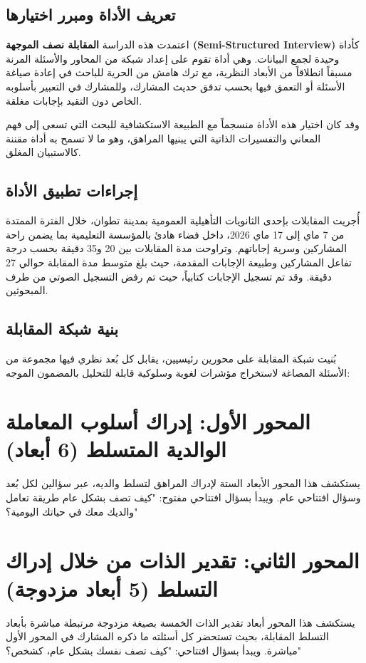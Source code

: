 \documentclass[12pt,oneside]{report}
\begin{document}
\subsection{تعريف الأداة ومبرر اختيارها}
اعتمدت هذه الدراسة \textbf{المقابلة نصف الموجهة (Semi-Structured Interview)} كأداة وحيدة لجمع البيانات. وهي أداة تقوم على إعداد شبكة من المحاور والأسئلة المرنة مسبقاً انطلاقاً من الأبعاد النظرية، مع ترك هامش من الحرية للباحث في إعادة صياغة الأسئلة أو التعمق فيها بحسب تدفق حديث المشارك، وللمشارك في التعبير بأسلوبه الخاص دون التقيد بإجابات مغلقة.

وقد كان اختيار هذه الأداة منسجماً مع الطبيعة الاستكشافية للبحث التي تسعى إلى فهم المعاني والتفسيرات الذاتية التي يبنيها المراهق، وهو ما لا تسمح به أداة مقننة كالاستبيان المغلق.

\subsection{إجراءات تطبيق الأداة}
أُجريت المقابلات بإحدى الثانويات التأهيلية العمومية بمدينة تطوان، خلال الفترة الممتدة من 7 ماي إلى 17 ماي 2026، داخل فضاء هادئ بالمؤسسة التعليمية بما يضمن راحة المشاركين وسرية إجاباتهم. وتراوحت مدة المقابلات بين 20 و35 دقيقة بحسب درجة تفاعل المشاركين وطبيعة الإجابات المقدمة، حيث بلغ متوسط مدة المقابلة حوالي 27 دقيقة. وقد تم تسجيل الإجابات كتابياً، حيث تم رفض التسجيل الصوتي من طرف المبحوثين.

\subsection{بنية شبكة المقابلة}
بُنيت شبكة المقابلة على محورين رئيسيين، يقابل كل بُعد نظري فيها مجموعة من الأسئلة المصاغة لاستخراج مؤشرات لغوية وسلوكية قابلة للتحليل بالمضمون الموجه:

\section{المحور الأول: إدراك أسلوب المعاملة الوالدية المتسلط (6 أبعاد)}
يستكشف هذا المحور الأبعاد الستة لإدراك المراهق لتسلط والديه، عبر سؤالين لكل بُعد وسؤال افتتاحي عام. ويبدأ بسؤال افتتاحي مفتوح: "كيف تصف بشكل عام طريقة تعامل والديك معك في حياتك اليومية؟"

\section{المحور الثاني: تقدير الذات من خلال إدراك التسلط (5 أبعاد مزدوجة)}
يستكشف هذا المحور أبعاد تقدير الذات الخمسة بصيغة مزدوجة مرتبطة مباشرة بأبعاد التسلط المقابلة، بحيث تستحضر كل أسئلته ما ذكره المشارك في المحور الأول مباشرة. ويبدأ بسؤال افتتاحي: "كيف تصف نفسك بشكل عام، كشخص؟"
\end{document}

